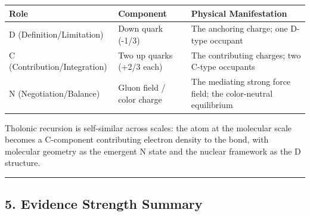 \documentclass[
  11pt,
  letterpaper,
]{article}
\begin{document}
\begin{longtable}[]{@{}
  >{\raggedright\arraybackslash}p{}
  >{\raggedright\arraybackslash}p{}
  >{\raggedright\arraybackslash}p{}@{}}
\toprule\noalign{}
\begin{minipage}[b]{\linewidth}\raggedright
Role
\end{minipage} & \begin{minipage}[b]{\linewidth}\raggedright
Component
\end{minipage} & \begin{minipage}[b]{\linewidth}\raggedright
Physical Manifestation
\end{minipage} \\
\midrule\noalign{}
\endhead
\bottomrule\noalign{}
\endlastfoot
D (Definition/Limitation) & Down quark (-1/3) & The anchoring charge;
one D-type occupant \\
C (Contribution/Integration) & Two up quarks (+2/3 each) & The
contributing charges; two C-type occupants \\
N (Negotiation/Balance) & Gluon field / color charge & The mediating
strong force field; the color-neutral equilibrium \\
\end{longtable}

Tholonic recursion is self-similar across scales: the atom at the
molecular scale becomes a C-component contributing electron density to
the bond, with molecular geometry as the emergent N state and the
nuclear framework as the D structure.

\begin{center}\rule{0.5\linewidth}{0.5pt}\end{center}

\subsection{5. Evidence Strength
Summary}\label{evidence-strength-summary}
\end{document}
